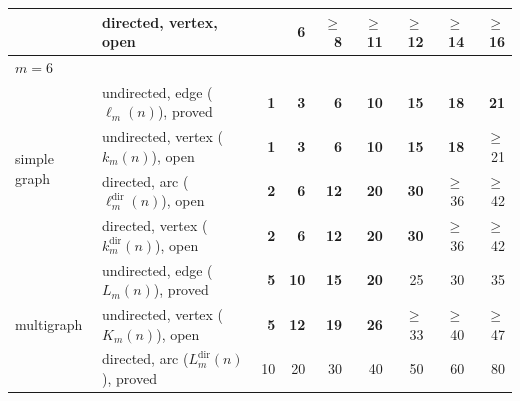 \begin{tabular}{llrrrrrrr}
 & directed, vertex, \textcolor{vtOpen}{open} &  & \textcolor{vtExact}{\textbf{6}} & \textcolor{vtOpen}{$\ge$8} & \textcolor{vtOpen}{$\ge$11} & \textcolor{vtOpen}{$\ge$12} & \textcolor{vtOpen}{$\ge$14} & \textcolor{vtOpen}{$\ge$16} \\
\midrule
\multicolumn{9}{l}{\textbf{$m=6$}} \\
\midrule
\multirow{4}{*}{simple graph} & undirected, edge ($\ell_m(n)$), \textcolor{vtProved}{proved} & \textcolor{vtExact}{\textbf{1}} & \textcolor{vtExact}{\textbf{3}} & \textcolor{vtExact}{\textbf{6}} & \textcolor{vtExact}{\textbf{10}} & \textcolor{vtExact}{\textbf{15}} & \textcolor{vtExact}{\textbf{18}} & \textcolor{vtExact}{\textbf{21}} \\
 & undirected, vertex ($k_m(n)$), \textcolor{vtOpen}{open} & \textcolor{vtExact}{\textbf{1}} & \textcolor{vtExact}{\textbf{3}} & \textcolor{vtExact}{\textbf{6}} & \textcolor{vtExact}{\textbf{10}} & \textcolor{vtExact}{\textbf{15}} & \textcolor{vtExact}{\textbf{18}} & \textcolor{vtOpen}{$\ge$21} \\
 & directed, arc ($\ell_m^{\mathrm{dir}}(n)$), \textcolor{vtOpen}{open} & \textcolor{vtExact}{\textbf{2}} & \textcolor{vtExact}{\textbf{6}} & \textcolor{vtExact}{\textbf{12}} & \textcolor{vtExact}{\textbf{20}} & \textcolor{vtExact}{\textbf{30}} & \textcolor{vtOpen}{$\ge$36} & \textcolor{vtOpen}{$\ge$42} \\
 & directed, vertex ($k_m^{\mathrm{dir}}(n)$), \textcolor{vtOpen}{open} & \textcolor{vtExact}{\textbf{2}} & \textcolor{vtExact}{\textbf{6}} & \textcolor{vtExact}{\textbf{12}} & \textcolor{vtExact}{\textbf{20}} & \textcolor{vtExact}{\textbf{30}} & \textcolor{vtOpen}{$\ge$36} & \textcolor{vtOpen}{$\ge$42} \\
\midrule
\multirow{4}{*}{multigraph} & undirected, edge ($L_m(n)$), \textcolor{vtProved}{proved} & \textcolor{vtExact}{\textbf{5}} & \textcolor{vtExact}{\textbf{10}} & \textcolor{vtExact}{\textbf{15}} & \textcolor{vtExact}{\textbf{20}} & \textcolor{vtProved}{25} & \textcolor{vtProved}{30} & \textcolor{vtProved}{35} \\
 & undirected, vertex ($K_m(n)$), \textcolor{vtOpen}{open} & \textcolor{vtExact}{\textbf{5}} & \textcolor{vtExact}{\textbf{12}} & \textcolor{vtExact}{\textbf{19}} & \textcolor{vtExact}{\textbf{26}} & \textcolor{vtOpen}{$\ge$33} & \textcolor{vtOpen}{$\ge$40} & \textcolor{vtOpen}{$\ge$47} \\
 & directed, arc ($L_m^{\mathrm{dir}}(n)$), \textcolor{vtProved}{proved} & \textcolor{vtProved}{10} & \textcolor{vtProved}{20} & \textcolor{vtProved}{30} & \textcolor{vtProved}{40} & \textcolor{vtProved}{50} & \textcolor{vtProved}{60} & \textcolor{vtProved}{80} \\

\end{tabular}
